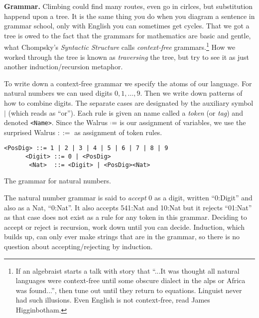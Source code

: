 
\medskip
\noindent \textbf{Grammar.}
Climbing could find many routes, even go in cirlces, but 
substitution happend upon a tree.  It is the
same thing you do when you diagram a sentence in grammar school, only with
English you can sometimes get cycles.  That we got a tree is owed to the fact
that the grammars for mathematics are basic and gentle, what Chompsky's 
\emph{Syntactic Structure} calls
\emph{context-free} grammars.\footnote{
    If an algebraist starts a talk with story that ``...It was thought  all natural 
    languages were context-free until some obscure dialect in the alps or Africa was found...'', 
    then tune out until they return to equations.  
    Linguist never had such illusions. Even English is not context-free, read  James Higginbotham.}  
How we worked through the tree is known as \emph{traversing}
the tree, but try to see it as just another induction/recursion metaphor.

To write down a context-free grammar we specify the atoms of our language.
For natural numbers we can used digits $0,1,\ldots, 9$.  Then we write down patterns of how to 
combine digits.  The separate cases are designated by the auxiliary symbol $|$ (which reads as ``or'').  Each rule 
is given an name called a \emph{token} (or \emph{tag}) and denoted \lstinline{<Name>}.
Since the Walrus $\defeq$ is our assignment of variables, we use the surprised Walrus $::=$ as assignment of token rules.
\begin{lstfloat}
\begin{lstlisting}[mathescape]
     <PosDig> ::= 1 | 2 | 3 | 4 | 5 | 6 | 7 | 8 | 9 
      <Digit> ::= 0 | <PosDig>
       <Nat>  ::= <Digit> | <PosDig><Nat>
\end{lstlisting}
\caption{The grammar for natural numbers.}
\end{lstfloat}

The natural number grammar is said to \emph{accept} $0$ as a digit, written ``0:Digit'' and also as 
a Nat, ``0:Nat''.  It also accepts 541:Nat and 10:Nat but it rejects ``01:Nat''
as that case does not exist as a rule for any token in this grammar.  Deciding to accept or 
reject is recursion, work down until you can decide.  Induction, which builds up, can only 
ever make strings that are in the grammar, so there is no question about accepting/rejecting 
by induction.


